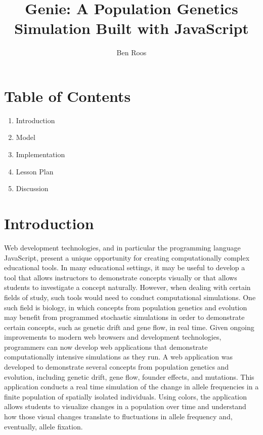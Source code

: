 \documentclass[12pt]{article}
\begin{document}
\begin{spacing}{.4}
\setlength{\droptitle}{-7em}
\title{Genie: A Population Genetics Simulation Built with JavaScript}
\author{Ben Roos}
\maketitle
\newpage
\end{spacing}

\begin{spacing}{1.5}

\section*{Table of Contents}
\begin{enumerate}
\item Introduction
\item Model
\item Implementation
\item Lesson Plan
\item Discussion

\end{enumerate}
\newpage

\section{Introduction}

Web development technologies, and in particular the programming language JavaScript, present a unique opportunity for creating computationally complex educational tools. In many educational settings, it may be useful to develop a tool that allows instructors to demonstrate concepts visually or that allows students to investigate a concept naturally. However, when dealing with certain fields of study, such tools would need to conduct computational simulations. One such field is biology, in which concepts from population genetics and evolution may benefit from programmed stochastic simulations in order to demonstrate certain concepts, such as genetic drift and gene flow, in real time. Given ongoing improvements to modern web browsers and development technologies, programmers can now develop web applications that demonstrate computationally intensive simulations as they run. A web application was developed to demonstrate several concepts from population genetics and evolution, including genetic drift, gene flow, founder effects, and mutations. This application conducts a real time simulation of the change in allele frequencies in a finite population of spatially isolated individuals. Using colors, the application allows students to visualize changes in a population over time and understand how those visual changes translate to fluctuations in allele frequency and, eventually, allele fixation.


\end{spacing}
\end{document}
